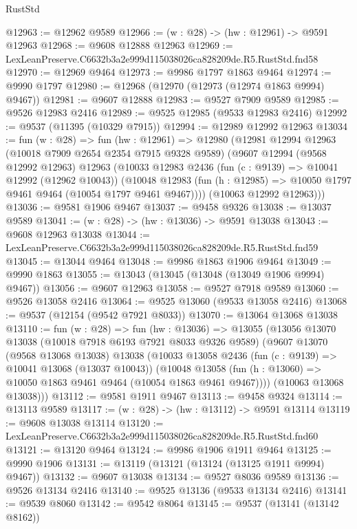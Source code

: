 \begin{lexlean}{RustStd}
\begin{coremodule}
@12963 := @12962 @9589
@12966 := (w : @28) -> (hw : @12961) -> @9591 @12963
@12968 := @9608 @12888 @12963
@12969 := LexLeanPreserve.C6632b3a2e999d115038026ca828209de.R5.RustStd.fnd58
@12970 := @12969 @9464
@12973 := @9986 @1797 @1863 @9464
@12974 := @9990 @1797
@12980 := @12968 (@12970 (@12973 (@12974 @1863 @9994) @9467))
@12981 := @9607 @12888
@12983 := @9527 @7909 @9589
@12985 := @9526 @12983 @2416
@12989 := @9525 @12985 (@9533 @12983 @2416)
@12992 := @9537 (@11395 (@10329 @7915))
@12994 := @12989 @12992 @12963
@13034 := fun (w : @28) =>
  fun (hw : @12961) =>
  @12980
    (@12981
      @12994
      @12963
      (@10018 @7909 @2654 @2354 @7915 @9328 @9589)
      (@9607
        @12994
        (@9568 @12992 @12963)
        @12963
        (@10033
          @12983
          @2436
          (fun (c : @9139) => @10041 @12992 (@12962 @10043))
          (@10048 @12983 (fun (h : @12985) => @10050 @1797 @9461 @9464 (@10054 @1797 @9461 @9467))))
        (@10063 @12992 @12963)))
@13036 := @9581 @1906 @9467
@13037 := @9458 @9326
@13038 := @13037 @9589
@13041 := (w : @28) -> (hw : @13036) -> @9591 @13038
@13043 := @9608 @12963 @13038
@13044 := LexLeanPreserve.C6632b3a2e999d115038026ca828209de.R5.RustStd.fnd59
@13045 := @13044 @9464
@13048 := @9986 @1863 @1906 @9464
@13049 := @9990 @1863
@13055 := @13043 (@13045 (@13048 (@13049 @1906 @9994) @9467))
@13056 := @9607 @12963
@13058 := @9527 @7918 @9589
@13060 := @9526 @13058 @2416
@13064 := @9525 @13060 (@9533 @13058 @2416)
@13068 := @9537 (@12154 (@9542 @7921 @8033))
@13070 := @13064 @13068 @13038
@13110 := fun (w : @28) =>
  fun (hw : @13036) =>
  @13055
    (@13056
      @13070
      @13038
      (@10018 @7918 @6193 @7921 @8033 @9326 @9589)
      (@9607
        @13070
        (@9568 @13068 @13038)
        @13038
        (@10033
          @13058
          @2436
          (fun (c : @9139) => @10041 @13068 (@13037 @10043))
          (@10048 @13058 (fun (h : @13060) => @10050 @1863 @9461 @9464 (@10054 @1863 @9461 @9467))))
        (@10063 @13068 @13038)))
@13112 := @9581 @1911 @9467
@13113 := @9458 @9324
@13114 := @13113 @9589
@13117 := (w : @28) -> (hw : @13112) -> @9591 @13114
@13119 := @9608 @13038 @13114
@13120 := LexLeanPreserve.C6632b3a2e999d115038026ca828209de.R5.RustStd.fnd60
@13121 := @13120 @9464
@13124 := @9986 @1906 @1911 @9464
@13125 := @9990 @1906
@13131 := @13119 (@13121 (@13124 (@13125 @1911 @9994) @9467))
@13132 := @9607 @13038
@13134 := @9527 @8036 @9589
@13136 := @9526 @13134 @2416
@13140 := @9525 @13136 (@9533 @13134 @2416)
@13141 := @9539 @8060
@13142 := @9542 @8064
@13145 := @9537 (@13141 (@13142 @8162))

\end{coremodule}
\end{lexlean}

